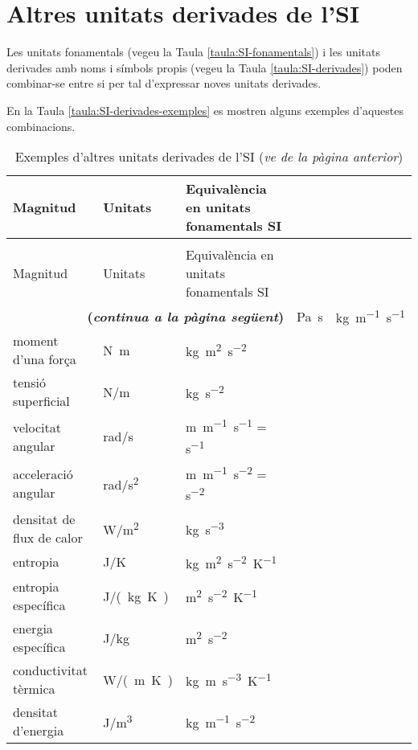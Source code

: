 \section{Altres unitats derivades de l'SI}

Les unitats fonamentals (vegeu la Taula \vref{taula:SI-fonamentals}) i les unitats derivades amb noms i símbols propis (vegeu la Taula \vref{taula:SI-derivades}) poden combinar-se entre si per tal d'expressar noves unitats derivades.

 En la Taula \vref{taula:SI-derivades-exemples} es mostren alguns exemples d'aquestes combinacions.

\begin{longtable}[h]{lll}
   \caption{\label{taula:SI-derivades-exemples} Exemples d'altres unitats derivades de
   l'SI}\\
   \toprule[1pt]
    Magnitud &  Unitats & Equivalència en unitats fonamentals SI\\
   \midrule
   \endfirsthead
   \caption[]{Exemples d'altres unitats derivades de l'SI (\emph{ve de la pàgina
   anterior})}\\
   \toprule[1pt]
    Magnitud &  Unitats & Equivalència en unitats fonamentals SI\\
   \midrule
   \endhead
   \midrule
   \multicolumn{3}{r}{\sffamily\bfseries\color{NavyBlue}(\emph{continua a la pàgina següent})}
   \endfoot
   \endlastfoot
   viscositat dinàmica &  \si{Pa.s}& \si{kg.m^{-1}.s^{-1}} \\
   moment d'una força & \si{N.m} & \si{kg.m^2.s^{-2}} \\
   tensió superficial &  \si{N/m} &   \si{kg.s^{-2}} \\
   velocitat angular & \si{rad/s} & \si{m.m^{-1}.s^{-1}} = \si{s^{-1}} \\
   acceleració angular & \si{rad/s^2} & \si{m.m^{-1}.s^{-2}} = \si{s^{-2}} \\
   densitat de flux de calor & \si{W/m^2} & \si{kg.s^{-3}} \\
   entropia & \si{J/K} & \si{kg.m^2.s^{-2}.K^{-1}} \\
   entropia específica & \si{J/(kg.K)} &\si{m^2.s^{-2}.K^{-1}} \\
   energia específica & \si{J/kg} & \si{m^2.s^{-2}} \\
   conductivitat tèrmica & \si{W/(m.K)} & \si{kg.m.s^{-3}.K^{-1}} \\
   densitat d'energia & \si{J/m^3} & \si{kg.m^{-1}.s^{-2}} \\

\end{longtable}
